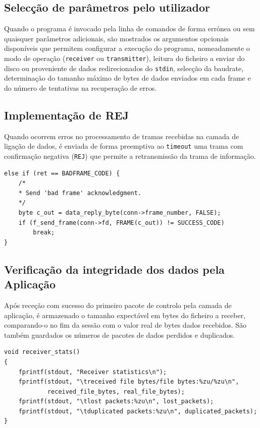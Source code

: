 \documentclass[a4paper,11pt,titlepage]{article}
\begin{document}
\subsection{Selecção de parâmetros pelo utilizador}
Quando o programa é invocado pela linha de comandos de forma errónea ou sem quaisquer parâmetros adicionais, são mostrados os argumentos opcionais disponíveis que permitem configurar a execução do programa, nomeadamente o modo de operação (\texttt{receiver} ou \texttt{transmitter}), leitura do ficheiro a enviar do disco ou proveniente de dados redirecionados do \texttt{stdin}, selecção da baudrate, determinação do tamanho máximo de bytes de dados enviados em cada frame e do número de tentativas na recuperação de erros. 

\subsection{Implementação de REJ}
Quando ocorrem erros no processamento de tramas recebidas na camada de ligação de dados, é enviada de forma preemptiva ao \texttt{timeout} uma trama com confirmação negativa (\texttt{REJ}) que permite a retransmissão da trama de informação.

\begin{lstlisting}[style=customc]
else if (ret == BADFRAME_CODE) {
	/*
	* Send 'bad frame' acknowledgment.
	*/
	byte c_out = data_reply_byte(conn->frame_number, FALSE);
	if (f_send_frame(conn->fd, FRAME(c_out)) != SUCCESS_CODE)
		break;
}
\end{lstlisting}

\subsection{Verificação da integridade dos dados pela Aplicação}
Após receção com sucesso do primeiro pacote de controlo pela camada de aplicação, é armazenado o tamanho expectável em bytes do ficheiro a receber, comparando-o no fim da sessão com o valor real de bytes dados recebidos. São também guardados os números de pacotes de dados perdidos e duplicados.

\begin{lstlisting}[style=customc]
void receiver_stats()
{
    fprintf(stdout, "Receiver statistics\n");
    fprintf(stdout, "\treceived file bytes/file bytes:%zu/%zu\n",
            received_file_bytes, real_file_bytes);
    fprintf(stdout, "\tlost packets:%zu\n", lost_packets);
    fprintf(stdout, "\tduplicated packets:%zu\n", duplicated_packets);
}
\end{lstlisting}
\end{document}
